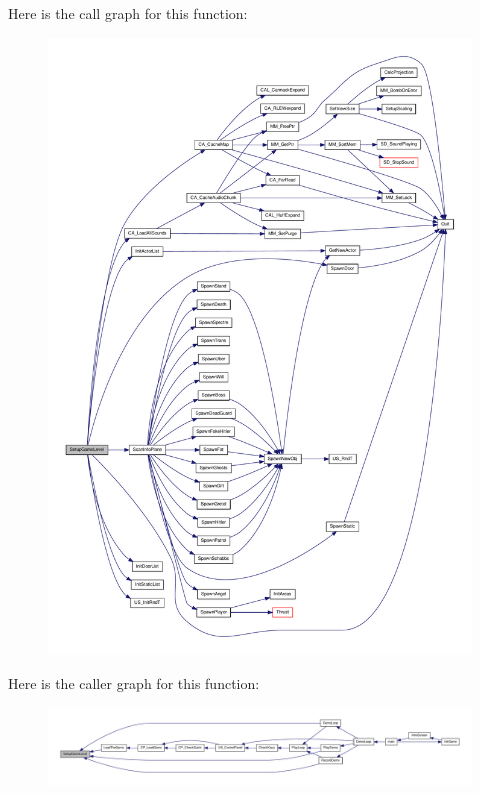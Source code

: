 Here is the call graph for this function:
\nopagebreak
\begin{figure}[H]
\begin{center}
\leavevmode
\includegraphics[width=400pt]{WL__DEF_8H_a272fa7f65051688198cb04c666d9977a_cgraph}
\end{center}
\end{figure}




Here is the caller graph for this function:
\nopagebreak
\begin{figure}[H]
\begin{center}
\leavevmode
\includegraphics[width=400pt]{WL__DEF_8H_a272fa7f65051688198cb04c666d9977a_icgraph}
\end{center}
\end{figure}


